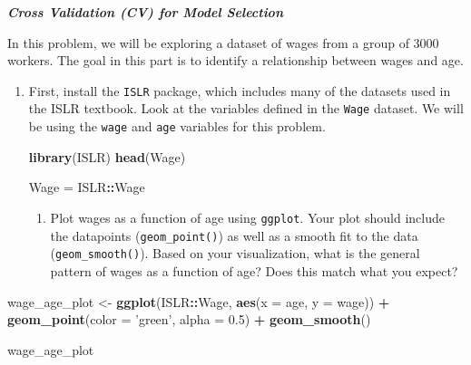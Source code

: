 \documentclass[]{article}
\newenvironment{Shaded}{\begin{snugshade}}{\end{snugshade}}
\newcommand{\KeywordTok}[1]{\textcolor[rgb]{0.13,0.29,0.53}{\textbf{#1}}}
\newcommand{\DataTypeTok}[1]{\textcolor[rgb]{0.13,0.29,0.53}{#1}}
\newcommand{\FloatTok}[1]{\textcolor[rgb]{0.00,0.00,0.81}{#1}}
\newcommand{\StringTok}[1]{\textcolor[rgb]{0.31,0.60,0.02}{#1}}
\newcommand{\OperatorTok}[1]{\textcolor[rgb]{0.81,0.36,0.00}{\textbf{#1}}}
\newcommand{\NormalTok}[1]{#1}
\providecommand{\tightlist}{%
  \setlength{\itemsep}{0pt}\setlength{\parskip}{0pt}}
\begin{document}
\textbf{\emph{Cross Validation (CV) for Model Selection}}

In this problem, we will be exploring a dataset of wages from a group of
3000 workers. The goal in this part is to identify a relationship
between wages and age.

\begin{enumerate}
\def\labelenumi{\arabic{enumi}.}
\setcounter{enumi}{5}
\item
  First, install the \texttt{ISLR} package, which includes many of the
  datasets used in the ISLR textbook. Look at the variables defined in
  the \texttt{Wage} dataset. We will be using the \texttt{wage} and
  \texttt{age} variables for this problem.

\begin{Shaded}
\begin{Highlighting}[]
\KeywordTok{library}\NormalTok{(ISLR)}
\KeywordTok{head}\NormalTok{(Wage)}

\NormalTok{Wage =}\StringTok{ }\NormalTok{ISLR}\OperatorTok{::}\NormalTok{Wage}
\end{Highlighting}
\end{Shaded}

  \begin{enumerate}
  \tightlist
  \item
    Plot wages as a function of age using \texttt{ggplot}. Your plot
    should include the datapoints (\texttt{geom\_point()}) as well as a
    smooth fit to the data (\texttt{geom\_smooth()}). Based on your
    visualization, what is the general pattern of wages as a function of
    age? Does this match what you expect?
  \end{enumerate}
\end{enumerate}

\begin{Shaded}
\begin{Highlighting}[]
\NormalTok{wage_age_plot <-}\StringTok{ }\KeywordTok{ggplot}\NormalTok{(ISLR}\OperatorTok{::}\NormalTok{Wage, }\KeywordTok{aes}\NormalTok{(}\DataTypeTok{x =}\NormalTok{ age, }\DataTypeTok{y =}\NormalTok{ wage)) }\OperatorTok{+}\StringTok{ }
\StringTok{  }\KeywordTok{geom_point}\NormalTok{(}\DataTypeTok{color =} \StringTok{'green'}\NormalTok{, }\DataTypeTok{alpha =} \FloatTok{0.5}\NormalTok{) }\OperatorTok{+}
\StringTok{  }\KeywordTok{geom_smooth}\NormalTok{()}

\NormalTok{wage_age_plot}
\end{Highlighting}
\end{Shaded}
\end{document}
